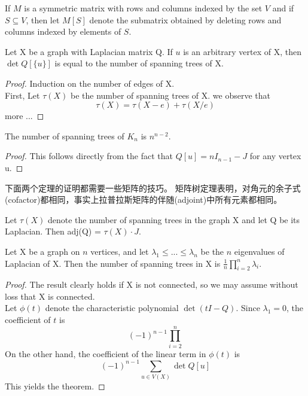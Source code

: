 \documentclass[11pt,fleqn]{book} %
\begin{document}
\begin{CJK}{UTF8}{gkai}
\begin{definition}
    If $M$ is a symmetric matrix with rows and columns indexed by the set $V$ and if $S \subseteq V$, then let $M[S]$ denote the submatrix obtained by deleting rows and columns indexed by elements of $S$.  
\end{definition}

\begin{theorem}
     Let X be a graph with Laplacian matrix Q. If $u$ is an arbitrary vertex of X, then $\det Q[\{u\}]$ is equal to the number of spanning trees of X.
\end{theorem}
\begin{proof}
    Induction on the number of edges of X. \\
    First, Let $\tau(X)$ be the number of spanning trees of X. we observe that 
    \[
        \tau (X) = \tau (X - e) + \tau (X/e)\]
    more ...
\end{proof}

\begin{corollary}
    The number of spanning trees of $K_n$ is $n^{n-2}$.
\end{corollary}
\begin{proof}
    This follows directly from the fact that $Q[u] = nI_{n-1} - J$ for any vertex u.    
\end{proof}

下面两个定理的证明都需要一些矩阵的技巧。
矩阵树定理表明，对角元的余子式(cofactor)都相同，事实上拉普拉斯矩阵的伴随(adjoint)中所有元素都相同。
\begin{theorem}
    Let $\tau (X)$ denote the number of spanning trees in the graph X and let Q be its Laplacian. Then adj(Q) = $\tau (X) \cdot J$.
\end{theorem}

\begin{theorem}
    Let X be a graph on $n$ vertices, and let $\lambda_1\leq...\leq\lambda_n$ be the $n$ eigenvalues of Laplacian of X. Then the number of spanning trees in X is
     $\frac 1 n {\prod_{i = 2}^{n}\lambda_i}$.
\end{theorem}
\begin{proof}
    The result clearly holds if X is not connected, so we may assume without loss that X is connected. \\
    Let $\phi(t)$ denote the characteristic polynomial $\det (tI - Q)$. Since $\lambda_1 = 0$, the coefficient of $t$ is 
    \[
        (-1)^{n-1}\prod_{i=2}^{n}\]
    On the other hand, the coefficient of the linear term in $\phi(t)$ is 
    \[
        (-1)^{n-1}\sum_{u \in V(X)} \det Q[u]\]
    This yields the theorem.    
\end{proof}


\end{CJK}
\end{document}
